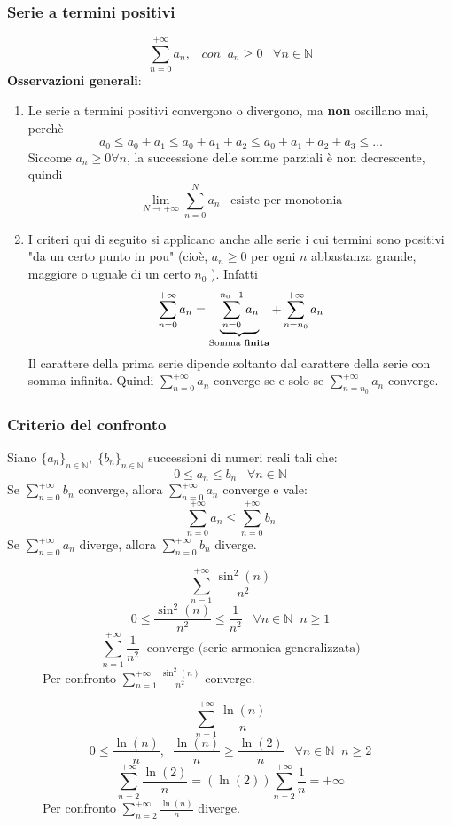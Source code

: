 \documentclass[a4paper]{article}
\theoremstyle{break}
\theoremstyle{break}
\theoremstyle{break}
\theoremstyle{break}
\begin{document}
\subsubsection{Serie a termini positivi}
\[
  \sum_{n=0}^{+\infty} a_n, \;\;\; con\;\; a_n \ge 0 \;\;\; \forall n \in \mathbb{N}
\] 
\textbf{Osservazioni generali}:
\begin{enumerate}
  \item Le serie a termini positivi convergono o divergono, ma \textbf{non} oscillano mai,
    perchè 
    \[
      a_0 \le a_0 + a_1 \le a_0 + a_1 + a_2 \le a_0 + a_1 + a_2 + a_3 \le \ldots
    \] 
    Siccome \( a_n \ge 0  \forall n\), la successione delle somme parziali è non decrescente,
    quindi
    \[
      \lim_{N \to +\infty} \sum_{n=0}^{N} a_n \;\;\;\text{esiste per monotonia}
    \] 
  \item I criteri qui di seguito si applicano anche alle serie i cui termini sono positivi
    "da un certo punto in pou" (cioè, \( a_n \ge 0 \) per ogni \( n \) abbastanza grande, maggiore
    o uguale di un certo \( n_0 \) ). Infatti
    \[
      \sum_{n=0}^{+\infty} a_n = \underbrace{\sum_{n=0}^{n_0-1} a_n}_{\text{Somma \textbf{finita}}} + \sum_{n=n_0}^{+\infty} a_n
    \] 
    Il carattere della prima serie dipende soltanto dal carattere della serie con somma infinita.
    Quindi \( \sum_{n=0}^{+\infty} a_n \) converge se e solo se \( \sum_{n=n_0}^{+\infty} a_n \) converge.
\end{enumerate}
\subsubsection{Criterio del confronto}
Siano \( \{a_n\}_{n \in \mathbb{N}},\;\{b_n\}_{n \in \mathbb{N}}  \) successioni di numeri reali
tali che:
\[
  0 \le a_n \le b_n \;\;\; \forall n \in \mathbb{N}
\] 
Se \( \sum_{n=0}^{+\infty} b_n \) converge, allora \( \sum_{n=0}^{+\infty} a_n \) converge e vale:
\[
  \sum_{n=0}^{+\infty} a_n \le \sum_{n=0}^{+\infty} b_n
\] 
Se \( \sum_{n=0}^{+\infty} a_n \) diverge, allora \( \sum_{n=0}^{+\infty} b_n \) diverge.
\begin{figure}[H]
  \begin{example}
    \[
      \sum_{n=1}^{+\infty} \frac{\sin^2(n)}{n^2}
    \] 
    \[
      0 \le \frac{\sin^2(n)}{n^2} \le \frac{1}{n^2} \;\;\; \forall n \in \mathbb{N} \;\; n \ge 1
    \] 
    \[
      \sum_{n=1}^{+\infty} \frac{1}{n^2} \;\;\text{converge (serie armonica generalizzata)}
    \] 
    Per confronto \( \sum_{n=1}^{+\infty} \frac{\sin^2(n)}{n^2} \) converge.
  \end{example}
\end{figure}
\begin{figure}[H]
  \begin{example}
    \[
      \sum_{n=1}^{+\infty} \frac{\ln(n)}{n}
    \] 
    \[
      0 \le \frac{\ln(n)}{n},\;\; \frac{\ln(n)}{n} \ge \frac{\ln(2)}{n} \;\;\; \forall n \in \mathbb{N} \;\; n \ge 2
    \] 
    \[
      \sum_{n=2}^{+\infty} \frac{\ln(2)}{n} = (\ln(2)) \sum_{n=2}^{+\infty} \frac{1}{n} = +\infty
    \] 
    Per confronto \( \sum_{n=2}^{+\infty} \frac{\ln(n)}{n} \) diverge.
  \end{example}
\end{figure}
\end{document}
